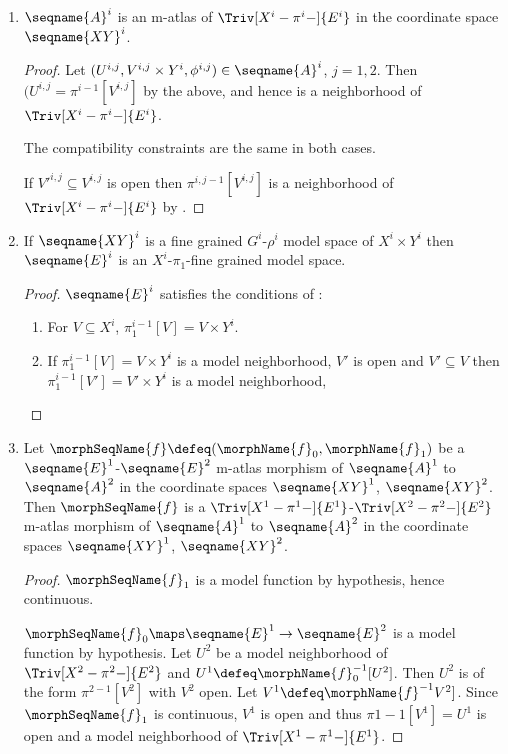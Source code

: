 \documentclass{article}
\begin{document}
\begin{lemma}
\begin{enumerate}
\item
$\seqname{A}^i$ is an m-atlas of $\Triv[X^i-\pi^i-]{E^i}$ in the
coordinate space $\seqname{XY}^i$.

\begin{proof}
Let $(U^{i,j},V^{i,j} \times Y^i,\phi^{i,j}) \in \seqname{A}^i$,
$j=1,2$. Then $(U^{i,j} = \pi^{i-1}[V^{i,j}]$ by the above, and hence is
a neighborhood of $\Triv[X^i-\pi^i-]{E^i}$.

The compatibility constraints are the same in both cases.

If $V'^{i,j} \subseteq V^{i,j}$ is open then $\pi^{i,j-1}[V^{i,j}]$ is a
neighborhood of $\Triv[X^i-\pi^i-]{E^i}$ by .

\end{proof}

\item
If $\seqname{XY}^i$ is a fine grained $G^i$-$\rho^i$ model space of
$X^i \times Y^i$ then $\seqname{E}^i$ is an $X^i$-$\pi_1$-fine grained model
space.

\begin{proof}
$\seqname{E}^i$ satisfies the conditions of :
\begin{enumerate}
\item
For $V \subseteq X^i$, $\pi^{i-1}_1[V] = V \times Y^i$.

\item
If $\pi^{i-1}_1[V] = V \times Y^i$ is a model neighborhood, $V'$ is open
and $V' \subseteq V$ then $\pi^{i-1}_1[V'] = V' \times Y^i$ is a model
neighborhood,
\end{enumerate}
\end{proof}

\item
Let $\morphSeqName{f} \defeq (\morphName{f}_0, \morphName{f}_1)$ be a
$\seqname{E}^1$-$\seqname{E}^2$ m-atlas morphism of $\seqname{A}^1$ to
$\seqname{A}^2$ in the coordinate spaces $\seqname{XY}^1$,
$\seqname{XY}^2$. Then $\morphSeqName{f}$ is a
$\Triv[X^1-\pi^1-]{E^1}$-$\Triv[X^2-\pi^2-]{E^2}$ m-atlas morphism of
$\seqname{A}^1$ to $\seqname{A}^2$ in the coordinate spaces
$\seqname{XY}^1$, $\seqname{XY}^2$.

\begin{proof}
$\morphSeqName{f}_1$ is a model function by hypothesis, hence continuous.

$\morphSeqName{f}_0 \maps \seqname{E}^1 \to \seqname{E}^2$ is a model
function by hypothesis. Let $U^2$ be a model neighborhood of
$\Triv[X^2-\pi^2-]{E^2}$ and $U^1 \defeq \morphName{f}^{-1}_0[U^2]$. Then
$U^2$ is of the form $\pi^{2-1}[V^2]$ with $V^2$ open. Let
$V^1 \defeq \morphName{f}^{-1}V^2]$. Since $\morphSeqName{f}_1$ is
continuous, $V^1$ is open and thus $\pi{1-1}[V^1] = U^1$ is open and a
model neighborhood of  $\Triv[X^1-\pi^1-]{E^1}$.


\end{proof}
\end{enumerate}
\end{lemma}
\end{document}
